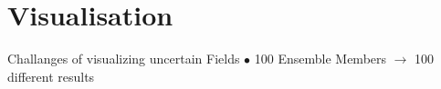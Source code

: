 \section{Visualisation}
\begin{frame}{Challanges of visualizing uncertain Fields}
    $\bullet$ 100 Ensemble Members $\to$ 100 different results

\end{frame}
